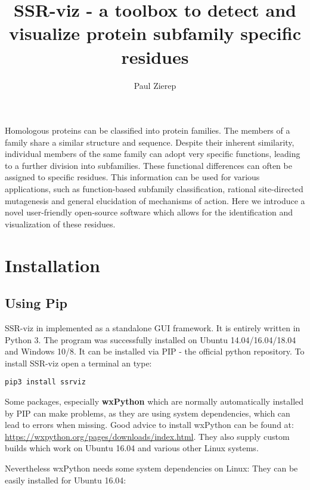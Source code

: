 \documentclass[a4paper,10pt]{article}
\title{SSR-viz - a toolbox to detect and visualize protein
subfamily specific residues}
\author{Paul Zierep}
\begin{document}
\maketitle

\begin{abstract}


\end{abstract}

Homologous proteins can be classified into protein families. The members of a family share a similar structure and sequence. Despite their inherent
similarity, individual members of the same family can adopt very specific functions, leading to a further division into subfamilies. These functional
differences can often be assigned to specific residues. This information can be used for various applications, such as function-based subfamily
classification, rational site-directed mutagenesis and general elucidation of mechanisms of action. Here we introduce a novel user-friendly open-source
software which allows for the identification and visualization of these residues.

\pagebreak
\tableofcontents
\pagebreak


\section{Installation}

\subsection{Using Pip}

SSR-viz in implemented as a standalone GUI framework. It is entirely 
written in Python 3. The program was successfully installed on
Ubuntu 14.04/16.04/18.04 and Windows 10/8. It can be installed via PIP - the official python repository. 
To install SSR-viz open a terminal an type: 

\begin{verbatim}
pip3 install ssrviz
\end{verbatim}

Some packages, especially \textbf{wxPython} 
which are normally automatically installed
by PIP can make problems, as they are using system dependencies, which can 
lead to errors when missing. 
Good advice to install wxPython can be 
found at: \url{https://wxpython.org/pages/downloads/index.html}.
They also supply custom builds which work on Ubuntu 16.04 and various other
Linux systems.

Nevertheless wxPython needs some system dependencies on Linux:
They can be easily installed for Ubuntu 16.04:
\end{document}
